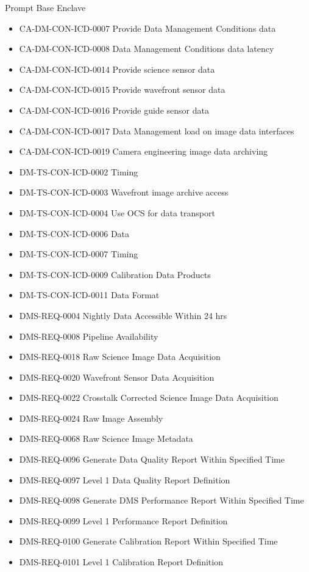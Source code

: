 Prompt Base Enclave \begin{itemize}
\item CA-DM-CON-ICD-0007 Provide Data Management Conditions data
\item CA-DM-CON-ICD-0008 Data Management Conditions data latency
\item CA-DM-CON-ICD-0014 Provide science sensor data
\item CA-DM-CON-ICD-0015 Provide wavefront sensor data
\item CA-DM-CON-ICD-0016 Provide guide sensor data
\item CA-DM-CON-ICD-0017 Data Management load on image data interfaces
\item CA-DM-CON-ICD-0019 Camera engineering image data archiving
\item DM-TS-CON-ICD-0002 Timing
\item DM-TS-CON-ICD-0003 Wavefront image archive access
\item DM-TS-CON-ICD-0004 Use OCS for data transport
\item DM-TS-CON-ICD-0006 Data
\item DM-TS-CON-ICD-0007 Timing
\item DM-TS-CON-ICD-0009 Calibration Data Products
\item DM-TS-CON-ICD-0011 Data Format
\item DMS-REQ-0004 Nightly Data Accessible Within 24 hrs
\item DMS-REQ-0008 Pipeline Availability
\item DMS-REQ-0018 Raw Science Image Data Acquisition
\item DMS-REQ-0020 Wavefront Sensor Data Acquisition
\item DMS-REQ-0022 Crosstalk Corrected Science Image Data Acquisition
\item DMS-REQ-0024 Raw Image Assembly
\item DMS-REQ-0068 Raw Science Image Metadata
\item DMS-REQ-0096 Generate Data Quality Report Within Specified Time
\item DMS-REQ-0097 Level 1 Data Quality Report Definition
\item DMS-REQ-0098 Generate DMS Performance Report Within Specified Time
\item DMS-REQ-0099 Level 1 Performance Report Definition
\item DMS-REQ-0100 Generate Calibration Report Within Specified Time
\item DMS-REQ-0101 Level 1 Calibration Report Definition

\end{itemize}
